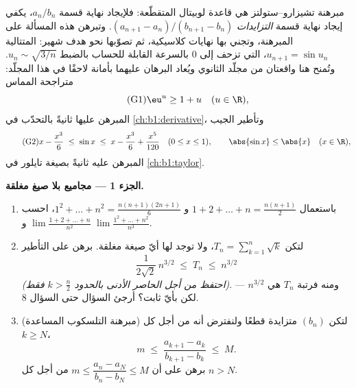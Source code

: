 \begin{problem}[{مسألة نهاية الأسبوع --- مبرهنة تشيزارو--ستولتز
والمقاربة $u_n \sim \sqrt{3/n}$ من أجل $u_{n+1} = \sin
u_n$}]
\label{pb:b1:seq:1}
مبرهنة تشيزارو--ستولتز هي قاعدة لوبيتال المتقطّعة: فلإيجاد
نهاية قسمة $a_n/b_n$، يكفي إيجاد
نهاية قسمة \emph{التزايدات} $(a_{n+1} -
a_n)/(b_{n+1} - b_n)$. وتبرهن هذه المسألة على المبرهنة، وتجني
بها نهايات كلاسيكية، ثم تصوّبها نحو هدف شهير:
المتتالية $u_{n+1} = \sin u_n$، التي تزحف إلى $0$ بالسرعة
القابلة للحساب بالضبط $u_n \sim \sqrt{3/n}$.
وتُمنح هنا واقعتان من مجلّد الثانوي
ويُعاد البرهان عليهما بأمانة لاحقًا في هذا
المجلّد: متراجحة المماس
\[
\tag{G1} \eu^{u} \geq 1 + u \quad (u \in \R),
\]
المبرهن عليها ثانيةً بالتحدّب في \cref{ch:b1:derivative}، وتأطير
الجيب
\[
\tag{G2} x - \frac{x^3}{6} \;\leq\; \sin x \;\leq\; x -
\frac{x^3}{6} + \frac{x^5}{120} \quad (0 \leq x \leq 1), \qquad
\abs{\sin x} \leq \abs{x} \quad (x \in \R),
\]
المبرهن عليه ثانيةً بصيغة تايلور في \cref{ch:b1:taylor}.

\medskip
\noindent\textbf{الجزء 1 --- مجاميع بلا صيغ مغلقة.}
\begin{enumerate}
  \item باستعمال $1 + 2 + \dots + n = \frac{n(n+1)}{2}$ و $1^2 +
        \dots + n^2 = \frac{n(n+1)(2n+1)}{6}$، احسب
        $\lim \frac{1 + 2 + \dots + n}{n^2}$ و $\lim \frac{1^2 +
        \dots + n^2}{n^3}$.
  \item لتكن $T_n = \sum_{k=1}^n \sqrt k$، ولا توجد لها أيّ صيغة
        مغلقة. برهن على التأطير
        \[
        \frac{1}{2\sqrt 2}\,n^{3/2} \;\leq\; T_n \;\leq\;
        n^{3/2}
        \]
        \emph{(احتفظ من أجل الحاصر الأدنى بالحدود $k > \frac n2$
        فقط)}. ومنه فرتبة $T_n$ هي $n^{3/2}$ --- لكن بأيّ
        ثابت؟ أرجئ السؤال حتى السؤال 8.
  \item (مبرهنة التلسكوب المساعدة) لتكن $(b_n)$ متزايدة قطعًا
        ولنفترض أنه من أجل كل $k \geq N$،
        \[
        m \;\leq\; \frac{a_{k+1} - a_k}{b_{k+1} - b_k} \;\leq\;
        M .
        \]
        برهن على أن $m \leq \dfrac{a_n - a_N}{b_n - b_N} \leq M$
        من أجل كل $n > N$.
\end{enumerate}


\end{problem}
